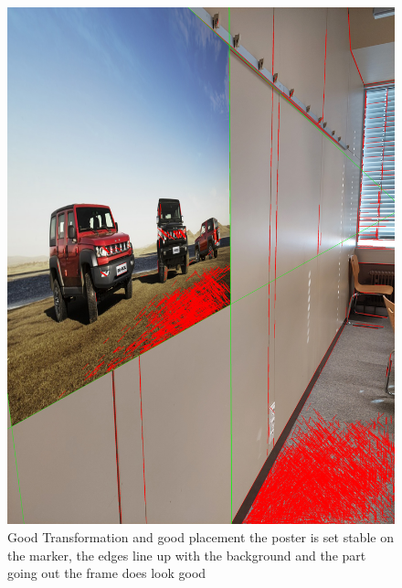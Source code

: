 \documentclass[a4paper,twocolumn]{article}
\begin{document}
    \begin{figure}[htbp]
    \centering
    \includegraphics[width=0.9\columnwidth]{img/20221115_113440.jpg} %
    \caption{Good Transformation and good placement the poster is set stable on the marker, the edges line up with the background and the part going out the frame does look good}
    \label{fig:20221115_113440.jpg}
    \end{figure}
    
\end{document}
